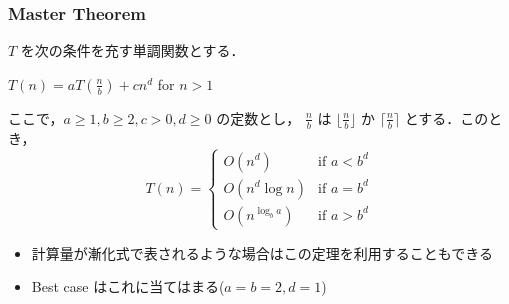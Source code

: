 \begin{frame}
\frametitle{Master Theorem}
  \begin{theorem}
$T$ を次の条件を充す単調関数とする．
    \begin{center}
\(T(n)=aT(\frac{n}{b})+cn^d\) for \(n>1\)
    \end{center}
ここで，\(a\geq 1,b\geq 2,c>0,d\geq 0\) の定数とし， \(\frac{n}{b}\) は \(\lfloor\frac{n}{b}\rfloor\) か \(\lceil\frac{n}{b}\rceil\)
とする．このとき，
\begin{displaymath}
T(n) = \left\{ \begin{array}{ll}
\displaystyle O(n^d)           & \mbox{if }a<b^d \\
              O(n^d\log n)     & \mbox{if }a=b^d \\
              O(n^{\log_b a})  & \mbox{if }a>b^d 
\end{array} \right.
\end{displaymath}
  \end{theorem}
  \begin{itemize}
\item 計算量が漸化式で表されるような場合はこの定理を利用することもできる
\item Best case はこれに当てはまる(\(a=b=2,d=1\))
  \end{itemize}
\end{frame}

%
%
